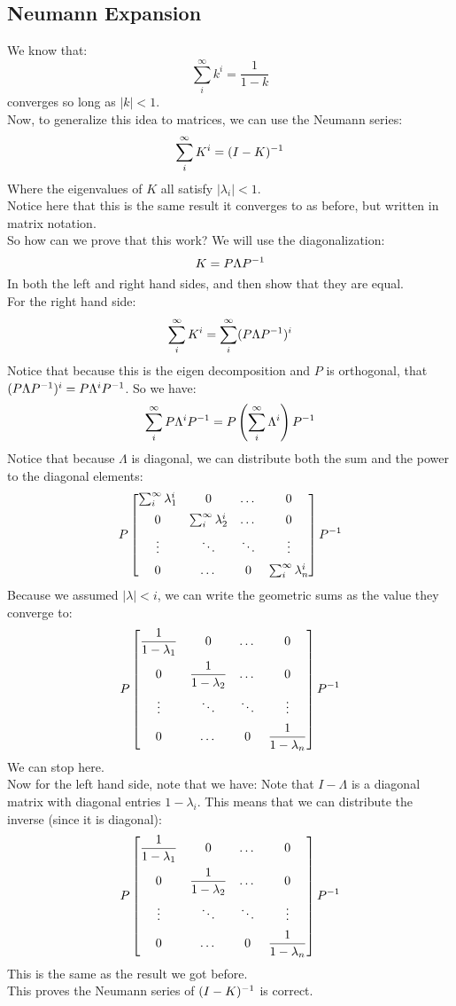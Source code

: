\documentclass[12pt]{article}
\begin{document}
\newpage

\subsection*{Neumann Expansion}

We know that:
\[ \sum_i^{\infty} k^i = \dfrac{1}{1 - k} \]
converges so long as $|k| < 1$. \\

Now, to generalize this idea to matrices,
we can use the Neumann series:
\[ \sum_i^{\infty} K^i = (I - K)^{-1} \]
Where the eigenvalues of $K$
all satisfy $|\lambda_i| < 1$. \\
Notice here that this is the same result
it converges to as before, but written in matrix
notation. \\

So how can we prove that this work?
We will use the diagonalization:
\[ K = P\Lambda P^{-1} \]
In both the left and right hand sides,
and then show that they are equal. \\

For the right hand side:
\[ \sum_i^{\infty} K^i
= \sum_i^{\infty} (P\Lambda P^{-1})^i \]
Notice that because this is the eigen decomposition
and $P$ is orthogonal,
that $(P\Lambda P^{-1})^i = P\Lambda^i P^{-1}$.
So we have:
\[ \sum_i^{\infty} P\Lambda^i P^{-1}
= P \left( \sum_i^{\infty}\Lambda^i \right) P^{-1} \]
Notice that because $\Lambda$ 
is diagonal, we can distribute both the 
sum and the power to the diagonal elements:
\[ P \bmat{ 
\sum_i^{\infty} \lambda_1^i & 0 & \dots & 0 \vs{5} \\
0 & \sum_i^{\infty} \lambda_2^i & \dots & 0 \vs{5} \\
\vdots & \ddots & \ddots & \vdots \vs{5} \\
0 & \dots & 0 & \sum_i^{\infty} \lambda_n^i } P\inv \]
Because we assumed $|\lambda| < i$,
we can write the geometric sums
as the value they converge to:
\[ P \bmat{ 
\dfrac{1}{1-\lambda_1} & 0 & \dots & 0 \vs{5} \\
0 & \dfrac{1}{1-\lambda_2} & \dots & 0 \vs{5} \\
\vdots & \ddots & \ddots & \vdots \vs{5} \\
0 & \dots & 0 & \dfrac{1}{1-\lambda_n} } P\inv \]
We can stop here. \\

Now for the left hand side, note that we have:
Note that $I - \Lambda$
is a diagonal matrix with diagonal entries
$1 - \lambda_i$. This means that
we can distribute the inverse (since it is
diagonal):
\[ P \bmat{ 
\dfrac{1}{1-\lambda_1} & 0 & \dots & 0 \vs{5} \\
0 & \dfrac{1}{1-\lambda_2} & \dots & 0 \vs{5} \\
\vdots & \ddots & \ddots & \vdots \vs{5} \\
0 & \dots & 0 & \dfrac{1}{1-\lambda_n} } P\inv \]
This is the same as the result we got before. \\
This proves the Neumann series of $(I - K)^{-1}$
is correct. \\
\end{document}
